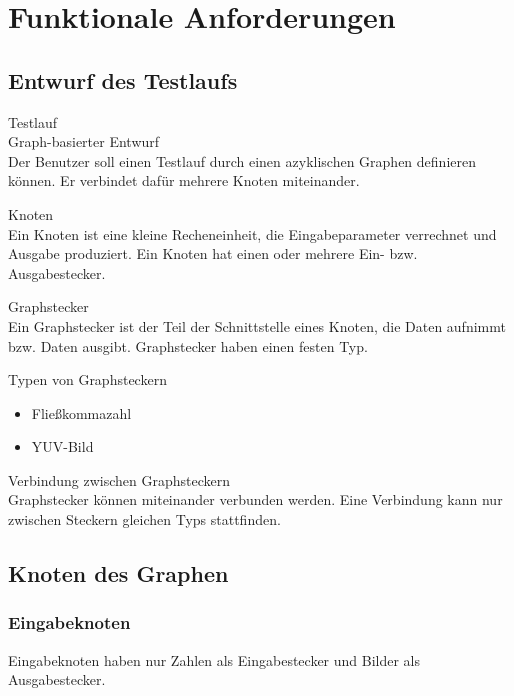\section{Funktionale Anforderungen}

\subsection{Entwurf des Testlaufs}

\begin{speclist}[F]
\setcounter{specnum}{11010}

\spec Testlauf \\
 

\spec Graph-basierter Entwurf \\
Der Benutzer soll einen Testlauf durch einen azyklischen Graphen definieren können. Er verbindet dafür mehrere Knoten miteinander.

\spec Knoten \\
Ein Knoten ist eine kleine Recheneinheit, die Eingabeparameter verrechnet und Ausgabe produziert. Ein Knoten hat einen oder mehrere Ein- bzw. Ausgabestecker.

\spec Graphstecker \\
Ein Graphstecker ist der Teil der Schnittstelle eines Knoten, die Daten aufnimmt bzw. Daten ausgibt. Graphstecker haben einen festen Typ.

\spec Typen von Graphsteckern
\begin{itemize}
	\item Fließkommazahl
	\item YUV-Bild
\end{itemize}

\spec Verbindung zwischen Graphsteckern \\
Graphstecker können miteinander verbunden werden. Eine Verbindung kann nur zwischen Steckern gleichen Typs stattfinden.

\end{speclist}

\subsection{Knoten des Graphen}

\subsubsection{Eingabeknoten}
Eingabeknoten haben nur Zahlen als Eingabestecker und Bilder als Ausgabestecker.

